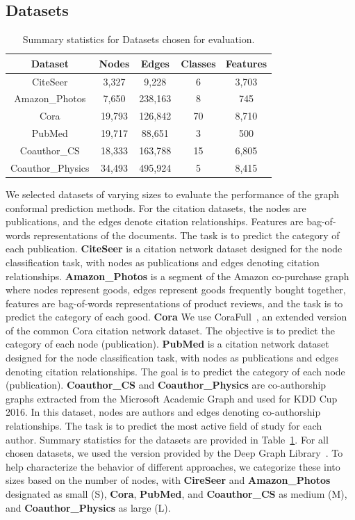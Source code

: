 \subsection{Datasets}

\begin{table}
    \centering
    \begin{tabular}{ccccc}
        \toprule
        Dataset & Nodes & Edges & Classes & Features \\
        \midrule
        CiteSeer & 3,327 & 9,228 & 6 & 3,703 \\ 
        Amazon\_Photos & 7,650 & 238,163 & 8 & 745 \\
        Cora & 19,793 & 126,842 & 70 & 8,710 \\
        PubMed & 19,717 & 88,651 & 3 & 500 \\
        Coauthor\_CS &  18,333 & 163,788 & 15 & 6,805 \\
        Coauthor\_Physics & 34,493 & 495,924 & 5 & 8,415 \\
        \bottomrule
    \end{tabular}
    \caption{Summary statistics for Datasets chosen for evaluation.}
    \label{tab:conformal:datasets}
\end{table}


We selected datasets of varying sizes to evaluate the performance of the graph conformal prediction methods.
For the citation datasets, the nodes are publications, and the edges denote citation relationships.
Features are bag-of-words representations of the documents.
The task is to predict the category of each publication.
\textbf{CiteSeer} is a citation network dataset designed for the node classification task, with nodes as publications and edges denoting citation relationships.
\textbf{Amazon\_Photos} is a segment of the Amazon co-purchase graph~\cite{mcauley2015image} where nodes represent goods, edges represent goods frequently bought together, features are bag-of-words representations of product reviews, and the task is to predict the category of each good.
\textbf{Cora} We use CoraFull~\cite{shchur2018pitfalls}, an extended version of the common Cora citation network dataset.
The objective is to predict the category of each node (publication).
\textbf{PubMed} is a citation network dataset designed for the node classification task, with nodes as publications and edges denoting citation relationships. The goal is to predict the category of each node (publication).
\textbf{Coauthor\_CS} and \textbf{Coauthor\_Physics} are co-authorship graphs extracted from the Microsoft Academic Graph and used for KDD Cup 2016. In this dataset, nodes are authors and edges denoting co-authorship relationships. The task is to predict the most active field of study for each author.
Summary statistics for the datasets are provided in Table~\ref{tab:conformal:datasets}.
For all chosen datasets, we used the version provided by the Deep Graph Library~\cite{wang2019dgl}.
To help characterize the behavior of different approaches, we categorize these into sizes based on the number of nodes, with \textbf{CireSeer} and \textbf{Amazon\_Photos} designated as small (S), \textbf{Cora}, \textbf{PubMed}, and \textbf{Coauthor\_CS} as medium (M), and \textbf{Coauthor\_Physics} as large (L).

